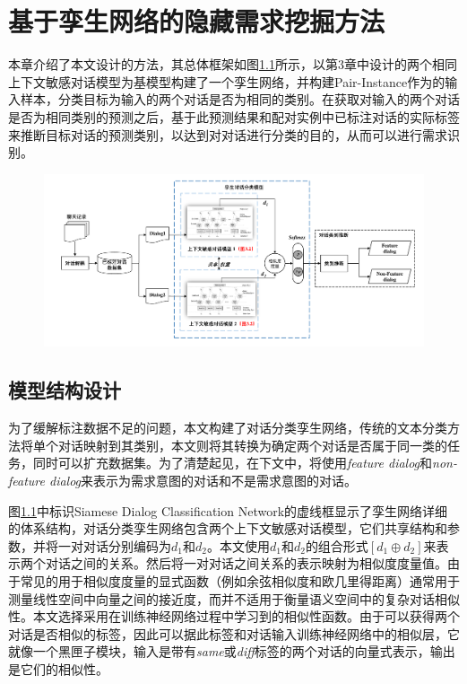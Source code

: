 \chapter{基于孪生网络的隐藏需求挖掘方法}
本章介绍了本文设计的{\tool}方法，其总体框架如图\ref{fig:approach}所示，{\tool}以第3章中设计的两个相同上下文敏感对话模型为基模型构建了一个孪生网络，并构建Pair-Instance作为{\tool}的输入样本，分类目标为输入的两个对话是否为相同的类别。在获取{\tool}对输入的两个对话是否为相同类别的预测之后，{\tool}基于此预测结果和配对实例中已标注对话的实际标签来推断目标对话的预测类别，以达到对对话进行分类的目的，从而可以进行需求识别。
\begin{figure}[htbp]
    \centering
    \includegraphics[width=\textwidth]{Img/approach.pdf}
    \label{fig:approach}
\end{figure}


\section{{\tool}模型结构设计}
为了缓解标注数据不足的问题，本文构建了对话分类孪生网络，传统的文本分类方法将单个对话映射到其类别，本文则将其转换为确定两个对话是否属于同一类的任务，同时可以扩充数据集。为了清楚起见，在下文中，将使用\textit{feature dialog}和\textit{non-feature dialog}来表示为需求意图的对话和不是需求意图的对话。

图\ref{fig:approach}中标识Siamese Dialog Classification Network的虚线框显示了孪生网络详细的体系结构，对话分类孪生网络包含两个上下文敏感对话模型，它们共享结构和参数，并将一对对话分别编码为$d_1$和$d_2$。本文使用$d_1$和$d_2$的组合形式$[{d_1}\oplus {d_2}]$来表示两个对话之间的关系。然后将一对对话之间关系的表示映射为相似度度量值。由于常见的用于相似度度量的显式函数（例如余弦相似度和欧几里得距离\cite{huang2008similarity}）通常用于测量线性空间中向量之间的接近度，而并不适用于衡量语义空间中的复杂对话相似性。本文选择采用在训练神经网络过程中学习到的相似性函数。由于可以获得两个对话是否相似的标签，因此可以据此标签和对话输入训练神经网络中的相似层，它就像一个黑匣子模块，输入是带有\textit{same}或\textit{diff}标签的两个对话的向量式表示，输出是它们的相似性。

